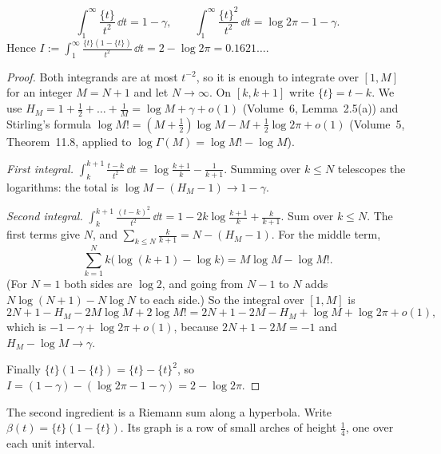 \begin{lemma}\label{lem:fracint}
\[
\int_1^\infty\frac{\{t\}}{t^2}\,\dd t=1-\gamma,\qquad\int_1^\infty\frac{\{t\}^2}{t^2}\,\dd t=\log2\pi-1-\gamma.
\]
Hence $I:=\int_1^\infty\frac{\{t\}(1-\{t\})}{t^2}\,\dd t=2-\log2\pi=0.1621\ldots$.
\end{lemma}
\begin{proof}
Both integrands are at most $t^{-2}$, so it is enough to integrate over $[1,M]$ for an integer $M=N+1$ and let $N\to\infty$. On $[k,k+1]$ write $\{t\}=t-k$. We use $H_M=1+\frac12+\dots+\frac1M=\log M+\gamma+o(1)$ (Volume~6, Lemma~2.5(a)) and Stirling's formula $\log M!=(M+\frac12)\log M-M+\frac12\log2\pi+o(1)$ (Volume~5, Theorem~11.8, applied to $\log\Gamma(M)=\log M!-\log M$).

\emph{First integral.} $\int_k^{k+1}\frac{t-k}{t^2}\,\dd t=\log\frac{k+1}k-\frac1{k+1}$. Summing over $k\le N$ telescopes the logarithms: the total is $\log M-(H_M-1)\to1-\gamma$.

\emph{Second integral.} $\int_k^{k+1}\frac{(t-k)^2}{t^2}\,\dd t=1-2k\log\frac{k+1}k+\frac k{k+1}$. Sum over $k\le N$. The first terms give $N$, and $\sum_{k\le N}\frac k{k+1}=N-(H_M-1)$. For the middle term,
\[
\sum_{k=1}^Nk\bigl(\log(k+1)-\log k\bigr)=M\log M-\log M!.
\]
(For $N=1$ both sides are $\log2$, and going from $N-1$ to $N$ adds $N\log(N+1)-N\log N$ to each side.) So the integral over $[1,M]$ is
\[
2N+1-H_M-2M\log M+2\log M!=2N+1-2M-H_M+\log M+\log2\pi+o(1),
\]
which is $-1-\gamma+\log2\pi+o(1)$, because $2N+1-2M=-1$ and $H_M-\log M\to\gamma$.

Finally $\{t\}(1-\{t\})=\{t\}-\{t\}^2$, so $I=(1-\gamma)-(\log2\pi-1-\gamma)=2-\log2\pi$.
\end{proof}

The second ingredient is a Riemann sum along a hyperbola. Write $\beta(t)=\{t\}(1-\{t\})$. Its graph is a row of small arches of height $\frac14$, one over each unit interval.

